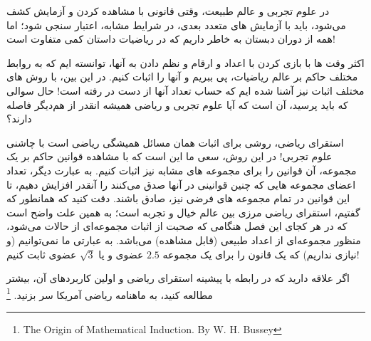 
 در علوم تجربی و عالم طبیعت، وقتی قانونی با مشاهده کردن و آزمایش کشف می‌شود، باید با آزمایش های متعدد بعدی، در شرایط مشابه، اعتبار سنجی شود؛
 اما همه از دوران دبستان به خاطر داریم که در ریاضیات داستان کمی متفاوت است! 

 اکثر وقت ها با بازی کردن با اعداد و ارقام و نظم دادن به آنها، توانسته ایم که به روابط مختلف حاکم بر عالم ریاضیات، پی ببریم و آنها را اثبات کنیم.
 در این بین، با روش های مختلف اثبات نیز آشنا شده ایم که حساب تعداد آنها از دست در رفته است!
 حال سوالی که باید پرسید، آن است که آیا علوم تجربی و ریاضی همیشه انقدر از هم‌دیگر فاصله دارند؟
 
 استقرای ریاضی، روشی  برای اثبات همان مسائل همیشگی ریاضی است با چاشنی علوم تجربی!
 در این روش، سعی ما این است که با مشاهده قوانین حاکم بر یک مجموعه، آن قوانین را برای مجموعه های مشابه نیز اثبات کنیم.
 به عبارت دیگر، تعداد اعضای مجموعه هایی که چنین قوانینی در آنها صدق می‌کنند را آنقدر افزایش دهیم، تا این قوانین در تمام مجموعه های فرضی نیز، صادق باشند.
 دقت کنید که همانطور که گفتیم، استقرای ریاضی مرزی بین عالم خیال و تجربه است؛ به همین علت
  واضح است که در هر کجای این فصل هنگامی که صحبت از اثبات مجموعه‌ای از حالات می‌شود، منظور مجموعه‌ای از اعداد طبیعی (قابل مشاهده) می‌باشد.
  به عبارتی ما نمی‌توانیم (و نیازی نداریم) که یک قانون را برای یک مجموعه $2.5$ عضوی و یا 
  $\sqrt{3}$
  عضوی ثابت کنیم!

  اگر علاقه دارید که در رابطه با پیشینه استقرای ریاضی و اولین کاربردهای آن، بیشتر مطالعه کنید، 
  به ماهنامه ریاضی آمریکا سر بزنید.
  \footnote[1]{The Origin of Mathematical Induction. By W. H. Bussey}
